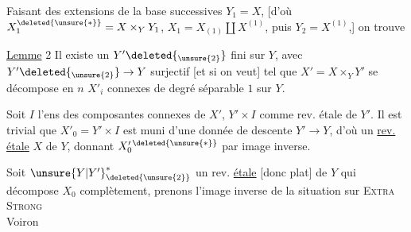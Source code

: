 Faisant des extensions de la base successives $Y_1=X$, [d'où $X_1^{\deleted{\unsure{*}}}=X\times_Y Y_1$, $X_1=X_{(1)}\amalg X^{(1)}$, puis $Y_2=X^{(1)}$,] on trouve

\uline{Lemme} 2 Il existe un $Y'\deleted{_{\unsure{2}}}$  fini sur $Y$, avec $Y'\deleted{_{\unsure{2}}}\to Y$ surjectif [et   si on veut] tel que $X'=X\times_Y Y'$ se décompose en $n$  $X'_i$ connexes de degré  séparable $1$ sur $Y$.

Soit $I$ l'ens des composantes connexes de $X'$,  $Y'\times I$ comme rev. étale de $Y'$. Il est trivial que $X'_0=Y'\times I$ est muni d'une donnée de descente  $Y'\to Y$, d'où un \uline{rev.} \uline{étale} $X$ de $Y$, donnant $X'_0{}^{\deleted{\unsure{*}}}$ par image inverse.


Soit ${\unsure{Y|Y'}}^{*}_{\deleted{\unsure{2}}}$ un rev. \uline{étale} [donc plat] de $Y$ qui décompose $X_0$ complètement, prenons l'image inverse de la situation sur
\textsc{Extra Strong}\\
 Voiron
